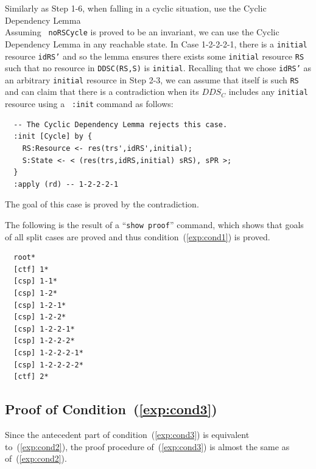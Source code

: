 \documentclass[12pt]{report}
\newcommand{\stt}[1]{{\small{\tt {#1}}}}
\begin{document}
 Similarly as Step 1-6, when falling in a
cyclic situation, use the Cyclic Dependency Lemma \\ Assuming {\tt
  noRSCycle} is proved to be an invariant, we can use the Cyclic
Dependency Lemma in any reachable state. In Case 1-2-2-2-1, there is a
{\tt initial} resource {\tt idRS'} and so the lemma ensures there
exists some {\tt initial} resource {\tt RS} such that no resource in
\stt{DDSC(RS,S)} is {\tt initial}. Recalling that we chose {\tt idRS'}
as an arbitrary {\tt initial} resource in Step 2-3, we can assume that
itself is such {\tt RS} and can claim that there is a contradiction
when its $DDS_C$ includes any {\tt initial} resource using a {\tt
  :init} command as follows:
\small
\begin{verbatim}
  -- The Cyclic Dependency Lemma rejects this case.
  :init [Cycle] by {
    RS:Resource <- res(trs',idRS',initial);
    S:State <- < (res(trs,idRS,initial) sRS), sPR >;
  }
  :apply (rd) -- 1-2-2-2-1
\end{verbatim}
\normalsize
The goal of this case is proved by the contradiction.

The following is the result of a ``\stt{show proof}'' command, which shows
that goals of all split cases are proved and thus
condition~(\ref{exp:cond1}) is proved.
\small
\begin{verbatim}
  root*
  [ctf] 1*
  [csp] 1-1*
  [csp] 1-2*
  [csp] 1-2-1*
  [csp] 1-2-2*
  [csp] 1-2-2-1*
  [csp] 1-2-2-2*
  [csp] 1-2-2-2-1*
  [csp] 1-2-2-2-2*
  [ctf] 2*
\end{verbatim}
\normalsize

\subsection{Proof of Condition~(\ref{exp:cond3})}
\label{sec:TOSCAmesmes}
Since the antecedent part of condition~(\ref{exp:cond3}) is equivalent
to~(\ref{exp:cond2}), the proof procedure of~(\ref{exp:cond3}) is
almost the same as of~(\ref{exp:cond2}). \\
\end{document}
